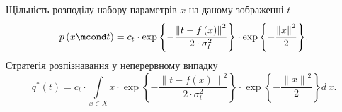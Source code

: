 Щільність розподілу набору параметрів $x$ на даному зображенні $t$
\begin{equation*}
  p\left( x \mcond t \right)
  = c_t
    \cdot \exp{\left\{ - \frac{\left\| t - f\left( x \right) \right\|^2}
                              {2 \cdot \sigma_t^2} \right\}}
    \cdot \exp{\left\{ - \frac{\left\| x \right\|^2}{2} \right\}}.
\end{equation*}
Стратегія розпізнавання у неперервному випадку
\begin{equation*}
  q^* \left( t \right)
  = c_t
    \cdot \int\limits_{x \in X}
      x
      \cdot \exp{\left\{ - \frac{\left\| t - f\left( x \right) \right\|^2}
                                {2 \cdot \sigma_t^2} \right\}}
      \cdot \exp{\left\{ - \frac{\left\| x \right\|^2}{2} \right\}}
    d\,x.
\end{equation*}
